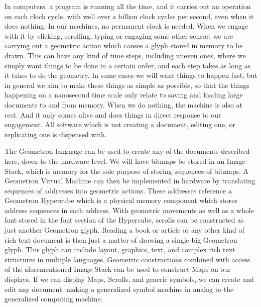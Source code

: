 In computers, a program is running all the time, and it carries out an operation on each clock cycle, with well over a billion clock cycles per second, even when it does nothing.  In our machines, no permanent clock is needed.  When we engage with it by clicking, scrolling, typing or engaging some other sensor, we are carrying out a geometric action which causes a glyph stored in memory to be drawn.  This can have any kind of time steps, including uneven ones, where we simply want things to be done in a certain order, and each step takes as long as it takes to do the geometry.  In some cases we will want things to happen fast, but in general we aim to make these things as simple as possible, so that the things happening on a nanosecond time scale only relate to saving and loading large documents to and from memory. When we do nothing, the machine is also at rest. And it only comes alive and does things in direct response to our engagement.  All software which is not creating a document, editing one, or replicating one is dispensed with.  

The Geometron language can be used to create any of the documents described here, down to the hardware level.  We will have bitmaps be stored in an Image Stack, which is memory for the sole purpose of storing sequences of bitmaps.  A Geometron Virtual Machine can then be implemented in hardware by translating sequences of addresses into geometric actions.  These addresses reference a Geometron Hypercube which is a physical memory component which stores address sequences in each address.  With geometric movements as well as a whole font stored in the font section of the Hypercube, scrolls can be constructed as just another Geometron glyph.  Reading a book or article or any other kind of rich text document is then just a matter of drawing a single big Geometron glyph.  This glyph can include layout, graphics, text, and complex rich text structures in multiple languages.  Geometric constructions combined with access of the aforementioned Image Stack can be used to construct Maps on our displays.  If we can display Maps, Scrolls, and generic symbols, we can create and edit any document, making a generalized symbol machine in analog to the generalized computing machine.

